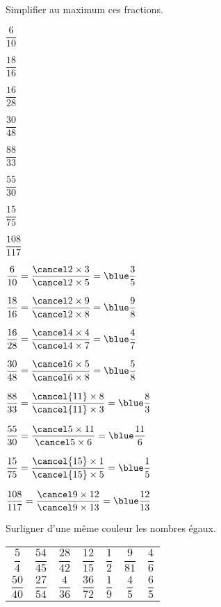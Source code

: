 \begin{colonne*exercice}
\smallskip


\begin{exercice} %
   Simplifier au maximum ces fractions. \medskip
   \begin{colenumerate}{4}
      \item $\dfrac{6}{10}$ \bigskip
      \item $\dfrac{18}{16}$ \bigskip
      \item $\dfrac{16}{28}$
      \item $\dfrac{30}{48}$
      \item $\dfrac{88}{33}$
      \item $\dfrac{55}{30}$
      \item $\dfrac{15}{75}$
      \item $\dfrac{108}{117}$
   \end{colenumerate}
\end{exercice}

\begin{corrige}
   \begin{colenumerate}{2}
      \item $\dfrac{6}{10} =\dfrac{\cancel2\times3}{\cancel2\times5} =\blue\dfrac35$ \bigskip
      \item $\dfrac{18}{16} =\dfrac{\cancel2\times9}{\cancel2\times8} =\blue\dfrac98$ \bigskip
      \item $\dfrac{16}{28} =\dfrac{\cancel4\times4}{\cancel4\times7} =\blue\dfrac47$ \bigskip
      \item $\dfrac{30}{48} =\dfrac{\cancel6\times5}{\cancel6\times8} =\blue\dfrac58$ \bigskip
      \item $\dfrac{88}{33} =\dfrac{\cancel{11}\times8}{\cancel{11}\times3} =\blue\dfrac83$ \bigskip
      \item $\dfrac{55}{30} =\dfrac{\cancel5\times11}{\cancel5\times6} =\blue\dfrac{11}6$ \bigskip
      \item $\dfrac{15}{75} =\dfrac{\cancel{15}\times1}{\cancel{15}\times5} =\blue\dfrac15$ \bigskip
      \item $\dfrac{108}{117} =\dfrac{\cancel9\times12}{\cancel9\times13} =\blue\dfrac{12}{13}$
   \end{colenumerate}
\end{corrige}

\smallskip


\begin{exercice} %
   Surligner d'une même couleur les nombres égaux. \\ [2mm]
   {
   \begin{tabular}{|*{7}{C{0.8}}|}
      \hline
      $\dfrac{5}{4}$ & $\dfrac{54}{45}$ & $\dfrac{28}{42}$ & $\dfrac{12}{15}$ & $\dfrac{1}{2}$ & $\dfrac{9}{81}$ & $\dfrac{4}{6}$ \\ [2mm]
      $\dfrac{50}{40}$ & $\dfrac{27}{54}$ & $\dfrac{4}{36}$ & $\dfrac{36}{72}$ & $\dfrac{1}{9}$ & $\dfrac{4}{5}$ & $\dfrac{6}{5}$ \\ [2mm]
      \hline
   \end{tabular}} \\ [1mm]
\end{exercice}


\end{colonne*exercice}
